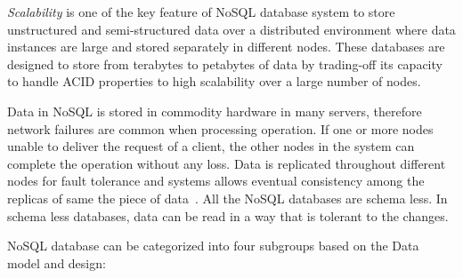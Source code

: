 	\textit{Scalability} is one of the key feature of NoSQL database system to store unstructured and semi-structured data over a distributed environment where data instances are large and stored separately in different nodes. These databases are designed to store from terabytes to petabytes of data by trading-off its capacity to handle ACID properties to high scalability over a large number of nodes\cite{abramova2013nosql}. 	
   \par  Data in NoSQL is stored in commodity hardware in many servers, therefore network failures are common when processing operation.  If one or more nodes unable to deliver the request of a client, the other nodes in the system can complete the operation without any loss. Data is replicated throughout different nodes for fault tolerance and systems allows eventual consistency among the replicas of same the piece of data~\cite{nosql/comparision}. All the NoSQL databases are schema less. In schema less databases, data can be read in a way that is tolerant to the changes.  
    \par NoSQL database can be categorized into four subgroups based on the Data model and design:
